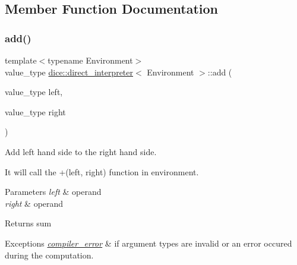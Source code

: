 \subsection{Member Function Documentation}
\mbox{\label{classdice_1_1direct__interpreter_a057b2d2b577b56077b04f223394323aa}} 
\subsubsection{\texorpdfstring{add()}{add()}}
{\footnotesize\ttfamily template$<$typename Environment$>$ \\
value\+\_\+type \mbox{\hyperlink{classdice_1_1direct__interpreter}{dice\+::direct\+\_\+interpreter}}$<$ Environment $>$\+::add (\begin{DoxyParamCaption}\item[{value\+\_\+type}]{left,  }\item[{value\+\_\+type}]{right }\end{DoxyParamCaption})\hspace{0.3cm}{\ttfamily [inline]}}



Add left hand side to the right hand side. 

It will call the +(left, right) function in environment.


\begin{DoxyParams}{Parameters}
{\em left} & operand \\
\hline
{\em right} & operand\\
\hline
\end{DoxyParams}
\begin{DoxyReturn}{Returns}
sum
\end{DoxyReturn}

\begin{DoxyExceptions}{Exceptions}
{\em \mbox{\hyperlink{classdice_1_1compiler__error}{compiler\+\_\+error}}} & if argument types are invalid or an error occured during the computation. \\
\hline
\end{DoxyExceptions}
\mbox{\label{classdice_1_1direct__interpreter_a8ec5df422b6b9175987b7f93c4dd0d7b}} 
